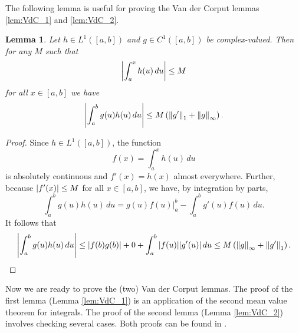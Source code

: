 \documentclass[11pt, letter]{book}
\newtheorem{lemma}[theorem]{Lemma}
\newcommand{\lp}{\left(}
\newcommand{\rp}{\right)}
\begin{document}
The following lemma is useful for proving the Van der Corput lemmas \ref{lem:VdC_1} and \ref{lem:VdC_2}. 

\begin{framed}
\begin{lemma}\label{lem:setup_VdC}
Let $h\in L^1([a,b])$ and $g\in C^1([a,b])$ be complex-valued. Then for any $M$ such that
\begin{equation*}
    \abs{\int^x_a h(u)\,du} \leq M
\end{equation*}
for all $x\in [a,b]$ we have
\begin{equation*}
    \abs{\int^b_a g(u)h(u)\,du} \leq M \lp \norm{g'}_1 + \norm{g}_\infty \rp.
\end{equation*}
\end{lemma}
\end{framed}
\begin{proof}
Since $h\in L^1([a,b])$, the function 
\begin{equation*}
    f(x) = \int^x_a h(u)\,du
\end{equation*}
is absolutely continuous and $f'(x) = h(x)$ almost everywhere. Further, because $\abs{f'(x)} \leq M$ for all $x\in [a,b]$, we have, by integration by parts,
\begin{equation*}
    \int^b_a g(u)h(u)\,du = g(u)f(u)\big\vert^b_a - \int^b_a g'(u)f(u)\,du.
\end{equation*}
It follows that
\begin{eqnarray*}
    \abs{\int^b_a g(u)h(u)\,du} 
    \leq \abs{f(b)g(b)} + 0 + \int^b_a \abs{f(u)} \abs{g'(u)}\,du \leq M\lp \norm{g}_\infty + \norm{g'}_1 \rp. 
\end{eqnarray*}
\end{proof}

\noindent Now we are ready to prove the (two) Van der Corput lemmas. The proof of the first lemma (Lemma \ref{lem:VdC_1}) is an application of the second mean value theorem for integrals. The proof of the second lemma (Lemma \ref{lem:VdC_2}) involves checking several cases. Both proofs can be found in \cite{thomee_stability_1965}.
\end{document}
